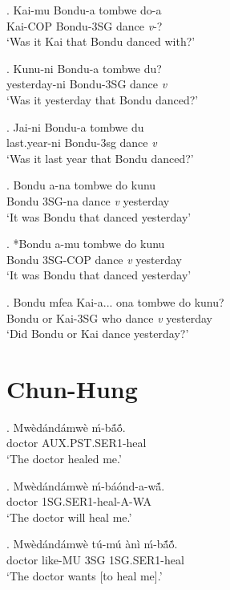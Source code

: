 \documentclass{assets/fieldnotes}
\begin{document}
\exg. Kai-mu Bondu-a tombwe do-a\\
Kai-COP Bondu-3SG dance \textit{v}-?\\
`Was it Kai that Bondu danced with?'

\exg. Kunu-ni Bondu-a tombwe du?\\
yesterday-ni Bondu-3SG dance \textit{v}\\
`Was it yesterday that Bondu danced?'

\exg. Jai-ni Bondu-a tombwe du\\
last.year-ni Bondu-3sg dance \textit{v}\\
`Was it last year that Bondu danced?'

\exg. Bondu a-na tombwe do kunu\\
Bondu 3SG-na dance \textit{v} yesterday\\
`It was Bondu that danced yesterday'

\exg. *Bondu a-mu tombwe do kunu\\
Bondu 3SG-COP dance \textit{v} yesterday\\
`It was Bondu that danced yesterday'

\exg. Bondu mfea Kai-a... \textipa{\textltailn}ona tombwe do kunu?\\
Bondu or Kai-3SG who dance \textit{v} yesterday\\
`Did Bondu or Kai dance yesterday?'\\



\section{Chun-Hung}

 \newline


\exg. Mw\`{e}d\'{a}nd\'{a}mw\`{e} \'{m}-bã́ṍ. \\
doctor AUX.PST.SER1-heal \\
`The doctor healed me.' 

\exg. Mw\`{e}d\'{a}nd\'{a}mw\`{e} \'{m}-b\'{a}\'{o}nd-a-wã́. \\
doctor 1SG.SER1-heal-A-WA \\
`The doctor will heal me.' 

\exg. Mw\`{e}d\'{a}nd\'{a}mw\`{e} t\'{u}-m\'{u} \`{a}n\`{i} \'{m}-bã́ṍ. \\
doctor like-MU 3SG 1SG.SER1-heal \\
`The doctor wants [to heal me].' 
\end{document}
